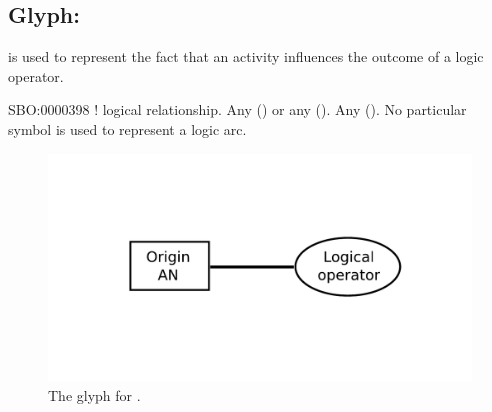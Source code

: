 
\subsection{Glyph:  }\label{sec:af:logicArc}

 is used to represent the fact that an activity influences the outcome of a logic operator.

\begin{glyphDescription}
 \glyphSboTerm SBO:0000398 ! logical relationship.
 \glyphOrigin Any  () or any  ().
 \glyphTarget Any  ().
 \glyphEndPoint No particular symbol is used to represent a logic arc.
 \end{glyphDescription}

\begin{figure}[H]
  \centering
  \includegraphics[scale = 0.4]{images/logicArc}
  \caption{The \AF glyph for .}
  \label{fig:logicArc}
\end{figure}
